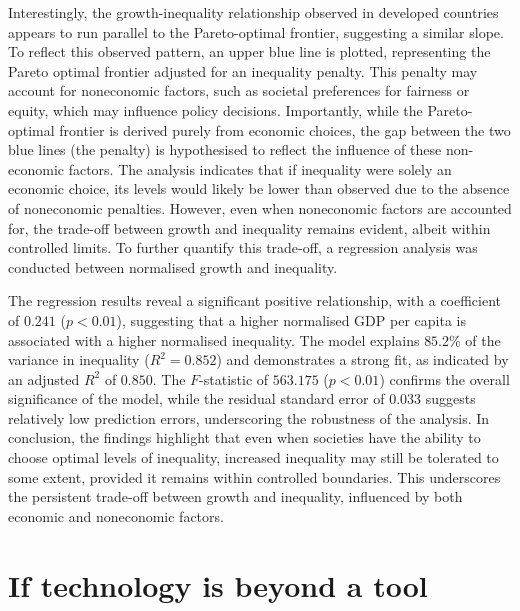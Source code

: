 \documentclass[12pt]{article}
\begin{document}
Interestingly, the growth-inequality relationship observed in developed countries appears to run parallel to the Pareto-optimal frontier, suggesting a similar slope. To reflect this observed pattern, an upper blue line is plotted, representing the Pareto optimal frontier adjusted for an inequality penalty. This penalty may account for noneconomic factors, such as societal preferences for fairness or equity, which may influence policy decisions. Importantly, while the Pareto-optimal frontier is derived purely from economic choices, the gap between the two blue lines (the penalty) is hypothesised to reflect the influence of these non-economic factors. The analysis indicates that if inequality were solely an economic choice, its levels would likely be lower than observed due to the absence of noneconomic penalties. However, even when noneconomic factors are accounted for, the trade-off between growth and inequality remains evident, albeit within controlled limits. To further quantify this trade-off, a regression analysis was conducted between normalised growth and inequality. 

The regression results reveal a significant positive relationship, with a coefficient of \(0.241\) (\(p < 0.01\)), suggesting that a higher normalised GDP per capita is associated with a higher normalised inequality. The model explains \(85.2\%\) of the variance in inequality (\(R^2 = 0.852\)) and demonstrates a strong fit, as indicated by an adjusted \(R^2\) of \(0.850\). The \(F\)-statistic of \(563.175\) (\(p < 0.01\)) confirms the overall significance of the model, while the residual standard error of \(0.033\) suggests relatively low prediction errors, underscoring the robustness of the analysis. In conclusion, the findings highlight that even when societies have the ability to choose optimal levels of inequality, increased inequality may still be tolerated to some extent, provided it remains within controlled boundaries. This underscores the persistent trade-off between growth and inequality, influenced by both economic and noneconomic factors.


\section{If technology is beyond a tool} \label{sec:technology}
\end{document}

